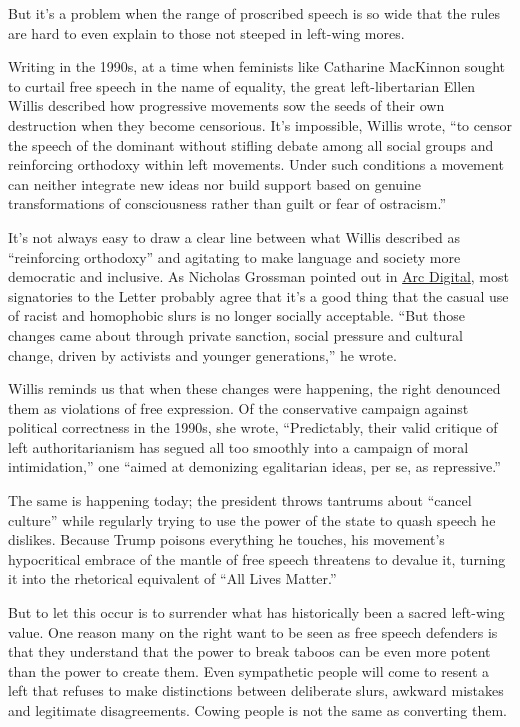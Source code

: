 But it's a problem when the range of proscribed speech is so wide that
the rules are hard to even explain to those not steeped in left-wing
mores.

Writing in the 1990s, at a time when feminists like Catharine MacKinnon
sought to curtail free speech in the name of equality, the great
left-libertarian Ellen Willis described how progressive movements sow
the seeds of their own destruction when they become censorious. It's
impossible, Willis wrote, ``to censor the speech of the dominant without
stifling debate among all social groups and reinforcing orthodoxy within
left movements. Under such conditions a movement can neither integrate
new ideas nor build support based on genuine transformations of
consciousness rather than guilt or fear of ostracism.''

It's not always easy to draw a clear line between what Willis described
as ``reinforcing orthodoxy'' and agitating to make language and society
more democratic and inclusive. As Nicholas Grossman pointed out in
\href{https://arcdigital.media/free-speech-defenders-dont-understand-the-critique-against-them-4ed8327c0879}{Arc
Digital}, most signatories to the Letter probably agree that it's a good
thing that the casual use of racist and homophobic slurs is no longer
socially acceptable. ``But those changes came about through private
sanction, social pressure and cultural change, driven by activists and
younger generations,'' he wrote.

Willis reminds us that when these changes were happening, the right
denounced them as violations of free expression. Of the conservative
campaign against political correctness in the 1990s, she wrote,
``Predictably, their valid critique of left authoritarianism has segued
all too smoothly into a campaign of moral intimidation,'' one ``aimed at
demonizing egalitarian ideas, per se, as repressive.''

The same is happening today; the president throws tantrums about
``cancel culture'' while regularly trying to use the power of the state
to quash speech he dislikes. Because Trump poisons everything he
touches, his movement's hypocritical embrace of the mantle of free
speech threatens to devalue it, turning it into the rhetorical
equivalent of ``All Lives Matter.''

But to let this occur is to surrender what has historically been a
sacred left-wing value. One reason many on the right want to be seen as
free speech defenders is that they understand that the power to break
taboos can be even more potent than the power to create them. Even
sympathetic people will come to resent a left that refuses to make
distinctions between deliberate slurs, awkward mistakes and legitimate
disagreements. Cowing people is not the same as converting them.

